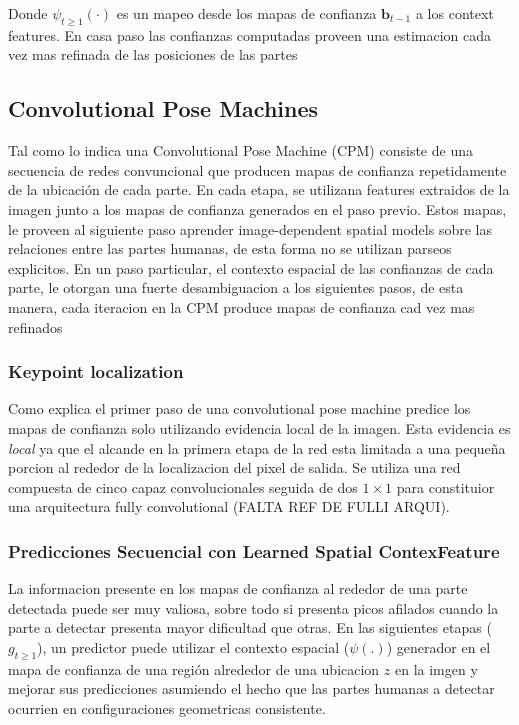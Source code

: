 \documentclass[runningheads]{llncs}
\begin{document}
Donde $\psi_{t\ge1}(\cdot)$ es un mapeo desde los mapas de confianza $\textbf{b}_{t-1}$ a los context features. En casa paso las confianzas computadas proveen una estimacion cada vez mas refinada de las posiciones de las partes

\subsection{Convolutional Pose Machines}

Tal como lo indica \cite{convposemachine} una Convolutional Pose Machine (CPM) consiste de una secuencia de redes convuncional que producen mapas de confianza repetidamente de la ubicación de cada parte. En cada etapa, se utilizana features extraidos de la imagen junto a los mapas de confianza generados en el paso previo. Estos mapas, le proveen al siguiente paso aprender image-dependent spatial models  sobre las relaciones entre las partes humanas, de esta forma no se utilizan parseos explicitos. En un paso particular, el contexto espacial de las confianzas de cada parte, le otorgan una fuerte desambiguacion a los siguientes pasos, de esta manera, cada iteracion en la CPM produce mapas de confianza cad vez mas refinados

\subsubsection{Keypoint localization}
Como explica \cite{convposemachine} el primer paso de una convolutional pose machine predice los mapas de confianza solo utilizando evidencia local de la imagen. Esta evidencia es \textit{local} ya que el alcande en la primera etapa de la red esta limitada a una pequeña porcion al rededor de la localizacion del pixel de salida. Se utiliza una red compuesta de cinco capaz convolucionales seguida de dos $ 1 \times 1 $ para constituior una arquitectura fully convolutional (FALTA REF DE FULLI ARQUI).

\subsubsection{Predicciones Secuencial con Learned Spatial ContexFeature}

La informacion presente en los mapas de confianza al rededor de una parte detectada puede ser muy valiosa, sobre todo si presenta picos afilados cuando la parte a detectar presenta mayor dificultad que otras. En las siguientes etapas ($g_{t\ge1}$), un predictor puede utilizar el contexto espacial ($\psi(.)$) generador en el mapa de confianza de una región alrededor de una ubicacion $z$ en la imgen y mejorar sus predicciones asumiendo el hecho que las partes humanas a detectar ocurrien en configuraciones geometricas consistente.
\end{document}
